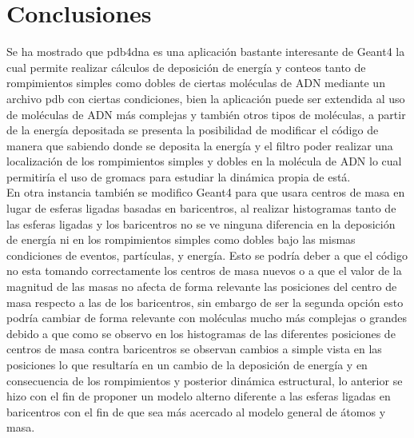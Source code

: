 \clearpage
\section{Conclusiones}
\label{sec:res}
Se ha mostrado que pdb4dna es una aplicación bastante interesante de Geant4 la cual permite realizar cálculos de deposición de energía y conteos tanto de rompimientos simples como dobles de ciertas moléculas de ADN mediante un archivo pdb con ciertas condiciones, bien la aplicación puede ser extendida al uso de moléculas de ADN más complejas y también otros tipos de moléculas, a partir de la energía depositada se presenta la posibilidad de modificar el código de manera que sabiendo donde se deposita la energía y el filtro poder realizar una localización de los rompimientos simples y dobles en la molécula de ADN lo cual permitiría el uso de gromacs para estudiar la dinámica propia de está.\\
En otra instancia también se modifico Geant4 para que usara centros de masa en lugar de esferas ligadas basadas en baricentros, al realizar histogramas tanto de las esferas ligadas y los baricentros no se ve ninguna diferencia en la deposición de energía ni en los rompimientos simples como dobles bajo las mismas condiciones de eventos, partículas, y energía. Esto se podría deber a que el código no esta tomando correctamente los centros de masa nuevos o a que el valor de la magnitud de las masas no afecta de forma relevante las posiciones del centro de masa respecto a las de los baricentros, sin embargo de ser la segunda opción esto podría cambiar de forma relevante con moléculas mucho más complejas o grandes debido a que como se observo en los histogramas de las diferentes posiciones de centros de masa contra baricentros se observan cambios a simple vista en las posiciones lo que resultaría en un cambio de la deposición de energía y en consecuencia de los rompimientos y posterior dinámica estructural, lo anterior se hizo con el fin de proponer un modelo alterno diferente a las esferas ligadas en baricentros con el fin de que sea más acercado al modelo general de átomos y masa.
